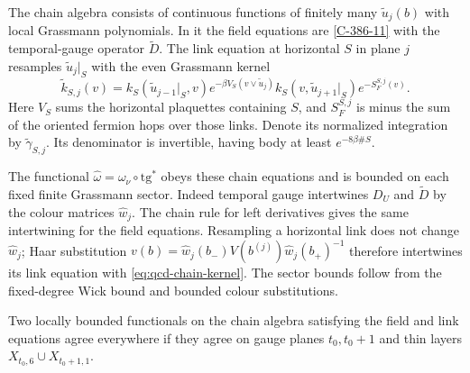 \documentclass[11pt,letterpaper,reqno]{amsart}
\makeatletter
\theoremstyle{definition}
\newcommand{\ms@minorstart}{%
  \pushQED{\qed}\renewcommand{\qedsymbol}{$\blacksquare$}}
\newenvironment{proposition}[1][]{\ms@minorstart\ms@proposition[#1]}
  {\popQED\endms@proposition}
\theoremstyle{remark}
\makeatother
\begin{document}
The chain algebra consists of continuous functions of finitely
many $\widetilde u_j(b)$ with local Grassmann polynomials.
In it the field equations are \eqref{C-386-11} with the
temporal-gauge operator $\widetilde D$. The link equation at
horizontal $S$ in plane $j$ resamples $\widetilde u_j|_S$
with the even Grassmann kernel
\begin{equation}\label{eq:qcd-chain-kernel}
 \widetilde k_{S,j}(v)=
 k_S(\widetilde u_{j-1}|_S,v)e^{-\beta V_S(v\vee\widetilde u_j)}
 k_S(v,\widetilde u_{j+1}|_S)e^{-S_F^{S,j}(v)}.
\end{equation}
Here $V_S$ sums the horizontal plaquettes containing $S$, and
$S_F^{S,j}$ is minus the sum of the oriented fermion hops over
those links. Denote its normalized integration by
$\widetilde\gamma_{S,j}$. Its denominator is invertible, having
body at least $e^{-8\beta\#S}$.

The functional $\widehat\omega=\omega_\nu\circ\mathrm{tg}^*$
obeys these chain equations and is bounded on each fixed finite
Grassmann sector. Indeed temporal gauge intertwines $D_U$ and
$\widetilde D$ by the colour matrices $\widehat w_j$.
The chain rule for left derivatives gives the same intertwining
for the field equations. Resampling a horizontal link does not
change $\widehat w_j$; Haar substitution
$v(b)=\widehat w_j(b_-)V(b^{(j)})\widehat w_j(b_+)^{-1}$
therefore intertwines its link equation with
\eqref{eq:qcd-chain-kernel}. The sector bounds follow from
the fixed-degree Wick bound and bounded colour substitutions.

\begin{proposition}[Uniqueness from two layers]\label{C-386-58}
Two locally bounded functionals on the chain algebra satisfying
the field and link equations agree everywhere if they agree on
gauge planes $t_0,t_0+1$ and thin layers
$X_{t_0,6}\cup X_{t_0+1,1}$.
\end{proposition}
\end{document}

